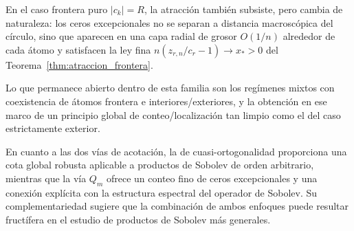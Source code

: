 En el caso frontera puro $|c_k|=R$, la atracción también subsiste, pero cambia de naturaleza: los ceros excepcionales no se separan a distancia macroscópica del círculo, sino que aparecen en una capa radial de grosor $O(1/n)$ alrededor de cada átomo y satisfacen la ley fina $n(z_{r,n}/c_r-1)\to x_*>0$ del Teorema~\ref{thm:atraccion_frontera}.

Lo que permanece abierto dentro de esta familia son los regímenes mixtos con coexistencia de átomos frontera e interiores/exteriores, y la obtención en ese marco de un principio global de conteo/localización tan limpio como el del caso estrictamente exterior.

En cuanto a las dos vías de acotación, la de cuasi-ortogonalidad proporciona una cota global robusta aplicable a productos de Sobolev de orden arbitrario, mientras que la vía $Q_m$ ofrece un conteo fino de ceros excepcionales y una conexión explícita con la estructura espectral del operador de Sobolev. Su complementariedad sugiere que la combinación de ambos enfoques puede resultar fructífera en el estudio de productos de Sobolev más generales.


